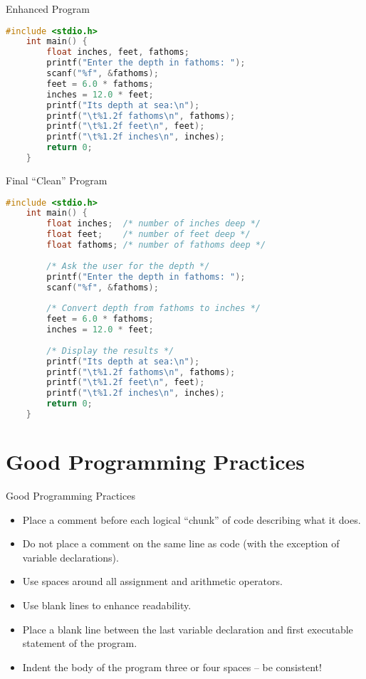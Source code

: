 \documentclass[graphics]{beamer}
\begin{document}
\begin{frame}[fragile]{Enhanced Program}
\begin{lstlisting}[language=C,basicstyle=\footnotesize,keywordstyle=\color{blue},commentstyle=\color{green},showstringspaces=false,stringstyle=\color{red}]
    #include <stdio.h>
    int main() {
        float inches, feet, fathoms;
        printf("Enter the depth in fathoms: ");
        scanf("%f", &fathoms);
        feet = 6.0 * fathoms;
        inches = 12.0 * feet;
        printf("Its depth at sea:\n");
        printf("\t%1.2f fathoms\n", fathoms);
        printf("\t%1.2f feet\n", feet);
        printf("\t%1.2f inches\n", inches);
        return 0;
    }
\end{lstlisting}
\end{frame}

\begin{frame}[fragile]{Final ``Clean'' Program}
\begin{lstlisting}[language=C,basicstyle=\footnotesize,keywordstyle=\color{blue},commentstyle=\color{green},showstringspaces=false,stringstyle=\color{red}]
    #include <stdio.h>
    int main() {
        float inches;  /* number of inches deep */
        float feet;    /* number of feet deep */
        float fathoms; /* number of fathoms deep */
        
        /* Ask the user for the depth */
        printf("Enter the depth in fathoms: ");
        scanf("%f", &fathoms);
        
        /* Convert depth from fathoms to inches */
        feet = 6.0 * fathoms;
        inches = 12.0 * feet;
        
        /* Display the results */
        printf("Its depth at sea:\n");
        printf("\t%1.2f fathoms\n", fathoms);
        printf("\t%1.2f feet\n", feet);
        printf("\t%1.2f inches\n", inches);
        return 0;
    }
\end{lstlisting}
\end{frame}

\section{Good Programming Practices}
\begin{frame}{Good Programming Practices}
    \begin{itemize}
        \item Place a comment before each logical ``chunk'' of code describing what it does.
        \item Do not place a comment on the same line as code (with the exception of variable declarations).
        \item Use spaces around all assignment and arithmetic operators.
        \item Use blank lines to enhance readability.
        \item Place a blank line between the last variable declaration and first executable statement of the program.
        \item Indent the body of the program three or four spaces -- be consistent!
    \end{itemize}
\end{frame}
\end{document}
